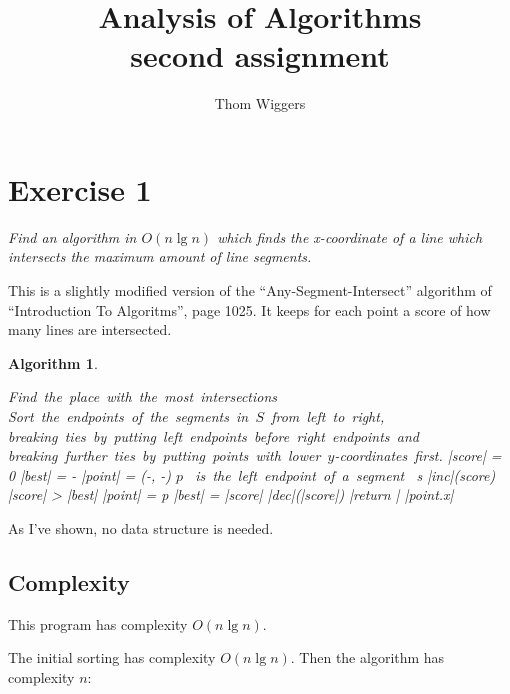 \documentclass{article}
\author{Thom Wiggers}
\title{Analysis of Algorithms\\{\large second assignment} }
\newtheorem{algorithm}{Algorithm}[section]
\begin{document}
\maketitle

\section{Exercise 1}

\emph{Find an algorithm in $O(n \lg n)$ which finds the x-coordinate of
a line which intersects the maximum amount of line segments.}

This is a slightly modified version of the ``Any-Segment-Intersect''
algorithm of ``Introduction To Algoritms'', page 1025. It keeps for 
each point a score of how many lines are intersected.
\begin{algorithm}
\begin{program}
  \mbox{Find the place with the most intersections}
  \label{one}
  \BEGIN \\
    \mbox{Sort the endpoints of the segments in $S$ from left to right,}
    \quad\mbox{breaking ties by putting left endpoints before right%
      endpoints and}
    \quad\mbox{breaking further ties by putting points with lower %
      $y$-coordinates first.}
    |score| = 0  \label{ass1}
    |best| = -\infty {}  \label{ass2}
    |point| = (-\infty, -\infty)   \label{ass3}
     \label{forb}
      \IF $p$ \mbox{ is the left endpoint of a segment } s \label{if1}
        \THEN 
          |inc|(score) 
          \IF |score| > |best| \label{if2}
            \THEN 
              |point| = p
              |best| = |score|
          \FI
        \ELSE
          |dec|(|score|) 
      \FI
    \END \label{forend}
    |return | |point.x|
  \END
\end{program}
\end{algorithm}

As I've shown, no data structure is needed.

\subsection{Complexity}
This program has complexity $O(n \lg n)$.

The initial sorting has complexity $O(n \lg n)$. Then the algorithm has
complexity $n$:
\end{document}
